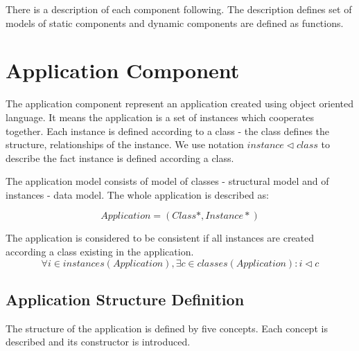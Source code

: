 \documentclass[11pt]{article}
\begin{document}
There is a description of each component following. The description defines set of models of static components and dynamic components are defined as functions.

\section{Application Component}
The application component represent an application created using object oriented language. It means the application is a set of instances which cooperates together. Each instance is defined according to a class - the class defines the structure, relationships of the instance. We use notation $instance \lhd class$ to describe the fact instance is defined according a class.

The application model consists of model of classes - structural model and of instances - data model. The whole application is described as:

$$
Application = (Class*, Instance*)
$$

The application is considered to be consistent if all instances are created according a class existing in the application. 
$$
\forall i \in instances(Application), \exists c \in classes(Application): i \lhd c 
$$


\subsection{Application Structure Definition}
The structure of the application is defined by five concepts. Each concept is described and its constructor is introduced.
\end{document}
